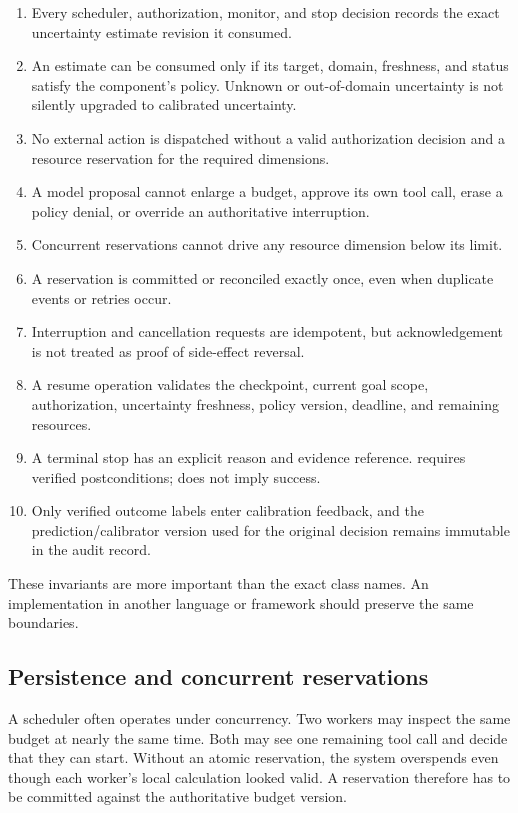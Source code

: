 \begin{enumerate}
  \item Every scheduler, authorization, monitor, and stop decision records the exact uncertainty estimate revision it consumed.
  \item An estimate can be consumed only if its target, domain, freshness, and status satisfy the component's policy. Unknown or out-of-domain uncertainty is not silently upgraded to calibrated uncertainty.
  \item No external action is dispatched without a valid authorization decision and a resource reservation for the required dimensions.
  \item A model proposal cannot enlarge a budget, approve its own tool call, erase a policy denial, or override an authoritative interruption.
  \item Concurrent reservations cannot drive any resource dimension below its limit.
  \item A reservation is committed or reconciled exactly once, even when duplicate events or retries occur.
  \item Interruption and cancellation requests are idempotent, but acknowledgement is not treated as proof of side-effect reversal.
  \item A resume operation validates the checkpoint, current goal scope, authorization, uncertainty freshness, policy version, deadline, and remaining resources.
  \item A terminal stop has an explicit reason and evidence reference. \texttt{} requires verified postconditions; \texttt{} does not imply success.
  \item Only verified outcome labels enter calibration feedback, and the prediction/calibrator version used for the original decision remains immutable in the audit record.
\end{enumerate}

These invariants are more important than the exact class names. An implementation in another language or framework should preserve the same boundaries.

\subsection{Persistence and concurrent reservations}
\label{sec:ch16-persistence}

A scheduler often operates under concurrency. Two workers may inspect the same budget at nearly the same time. Both may see one remaining tool call and decide that they can start. Without an atomic reservation, the system overspends even though each worker's local calculation looked valid. A reservation therefore has to be committed against the authoritative budget version.

